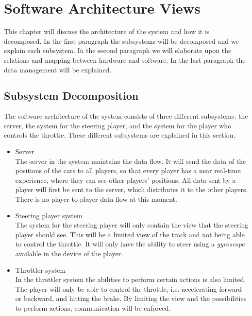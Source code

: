 \documentclass[11pt,twoside,a4paper]{article}
\begin{document}
\newpage


\section{Software Architecture Views}
This chapter will discuss the architecture of the system and how it is decomposed. In the first paragraph the subsystems will be decomposed and we explain each subsystem. In the second paragraph we will elaborate upon the relations and mapping between hardware and software. In the last paragraph the data management will be explained.


\subsection{Subsystem Decomposition}
The software architecture of the system consists of three different subsystems: the server, the system for the steering player, and the system for the player who controls the throttle. These different subsystems are explained in this section.

\begin{itemize}
\item Server \hfill \\
    The server in the system maintains the data flow. It will send the data of the positions of the cars to all players, so that every player has a near real-time experience, where they can see other players' positions. All data sent by a player will first be sent to the server, which distributes it to the other players. There is no player to player data flow at this moment.
\item Steering player system \hfill \\
    The system for the steering player will only contain the view that the steering player should see. This will be a limited view of the track and not being able to control the throttle. It will only have the ability to steer using a \emph{gyroscope} available in the device of the player.
\item Throttler system \hfill \\
    In the throttler system the abilities to perform certain actions is also limited. The player will only be able to control the throttle, i.e. accelerating forward or backward, and hitting the brake. By limiting the view and the possibilities to perform actions, communication will be enforced.
\end{itemize}
\end{document}
